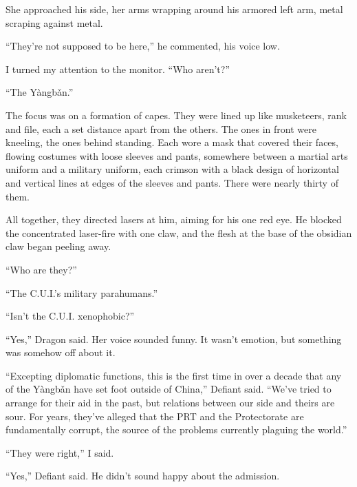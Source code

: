 She approached his side, her arms wrapping around his armored left arm, metal scraping against metal.



``They're not supposed to be here,'' he commented, his voice low.



I turned my attention to the monitor.  ``Who aren't?''



``The Y\`{a}ngb\v{a}n.''



The focus was on a formation of capes.  They were lined up like musketeers, rank and file, each a set distance apart from the others.  The ones in front were kneeling, the ones behind standing.  Each wore a mask that covered their faces, flowing costumes with loose sleeves and pants, somewhere between a martial arts uniform and a military uniform, each crimson with a black design of horizontal and vertical lines at edges of the sleeves and pants.  There were nearly thirty of them.



All together, they directed lasers at him, aiming for his one red eye.  He blocked the concentrated laser-fire with one claw, and the flesh at the base of the obsidian claw began peeling away.



``Who are they?''



``The C.U.I.'s military parahumans.''



``Isn't the C.U.I. xenophobic?''



``Yes,'' Dragon said.  Her voice sounded funny.  It wasn't emotion, but something was somehow off about it.



``Excepting diplomatic functions, this is the first time in over a decade that any of the Y\`{a}ngb\v{a}n have set foot outside of China,'' Defiant said.  ``We've tried to arrange for their aid in the past, but relations between our side and theirs are sour.  For years, they've alleged that the PRT and the Protectorate are fundamentally corrupt, the source of the problems currently plaguing the world.''



``They were right,''  I said.



``Yes,'' Defiant said.  He didn't sound happy about the admission.



